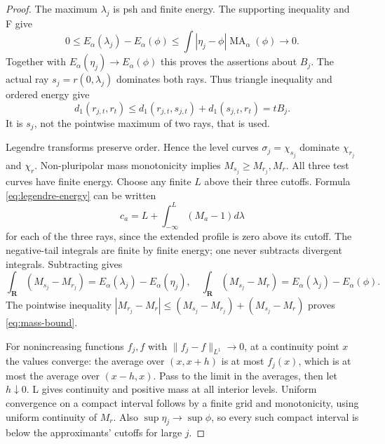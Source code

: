 \documentclass[11pt]{article}
\newcommand{\MA}{\operatorname{MA}}
\theoremstyle{remark}\newtheorem{remark}[theorem]{Remark}
\begin{document}
\begin{proof}
The maximum $\lambda_j$ is psh and finite energy. The supporting
inequality and F give
\[
 0\leq E_\alpha(\lambda_j)-E_\alpha(\phi)
 \leq\int|\eta_j-\phi|\MA_\alpha(\phi)\to0.
\]
Together with $E_\alpha(\eta_j)\to E_\alpha(\phi)$ this proves the
assertions about $B_j$. The actual ray $s_j=r(0,\lambda_j)$ dominates
both rays. Thus triangle inequality and ordered energy give
\[
 d_1(r_{j,t},r_t)\leq d_1(r_{j,t},s_{j,t})+d_1(s_{j,t},r_t)
 =tB_j.
\]
It is $s_j$, not the pointwise maximum of two rays, that is used.

Legendre transforms preserve order. Hence the level curves
$\sigma_j=\chi_{s_j}$ dominate $\chi_{r_j}$ and $\chi_r$.
Non-pluripolar mass monotonicity implies
$M_{s_j}\geq M_{r_j},M_r$. All three test curves have finite energy.
Choose any finite $L$ above their three cutoffs. Formula
\eqref{eq:legendre-energy} can be written
\[
 c_a=L+\int_{-\infty}^L(M_a-1)d\lambda
\]
for each of the three rays, since the extended profile is zero above
its cutoff. The negative-tail integrals are finite by finite energy;
one never subtracts divergent integrals. Subtracting gives
\[
 \int_{\mathbf R}(M_{s_j}-M_{r_j})=E_\alpha(\lambda_j)-E_\alpha(\eta_j),
 \quad
 \int_{\mathbf R}(M_{s_j}-M_r)=E_\alpha(\lambda_j)-E_\alpha(\phi).
\]
The pointwise inequality
$|M_{r_j}-M_r|\leq(M_{s_j}-M_{r_j})+(M_{s_j}-M_r)$ proves
\eqref{eq:mass-bound}.

For nonincreasing functions $f_j,f$ with $\|f_j-f\|_{L^1}\to0$,
at a continuity point $x$ the values converge: the average over
$(x,x+h)$ is at most $f_j(x)$, which is at most the average over
$(x-h,x)$. Pass to the limit in the averages, then let $h\downarrow0$.
L gives continuity and positive mass at all interior levels. Uniform
convergence on a compact interval follows by a finite grid and
monotonicity, using uniform continuity of $M_r$. Also
$\sup\eta_j\to\sup\phi$, so every such compact interval is below
the approximants' cutoffs for large $j$.
\end{proof}
\end{document}
